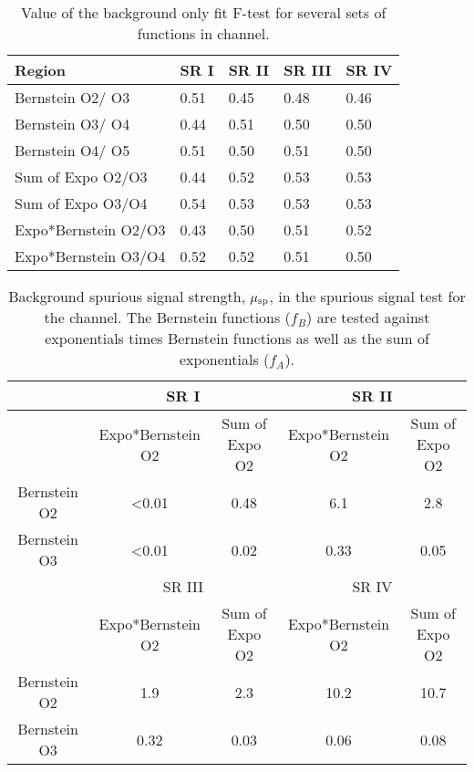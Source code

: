 \begin{table}[htbp]
\centering
\caption{Value of the background only fit F-test for several sets of functions in \twocentral channel.}
\label{tab:f-test_sensitive}
\begin{tabular}{|l|l|l|l|l|}
\hline
Region               & SR I & SR II & SR III & SR IV \\ \hline
Bernstein O2/ O3     & 0.51 & 0.45  & 0.48   & 0.46  \\ \hline
Bernstein O3/ O4     & 0.44 & 0.51  & 0.50   & 0.50  \\ \hline
Bernstein O4/ O5     & 0.51 & 0.50  & 0.51   & 0.50  \\ \hline
Sum of Expo O2/O3    & 0.44 & 0.52  & 0.53   & 0.53  \\ \hline
Sum of Expo O3/O4    & 0.54 & 0.53  & 0.53   & 0.53  \\ \hline
Expo*Bernstein O2/O3 & 0.43 & 0.50  & 0.51   & 0.52  \\ \hline
Expo*Bernstein O3/O4 & 0.52 & 0.52  & 0.51   & 0.50  \\ \hline
\end{tabular}
\end{table}

\begin{table}[htbp]
\centering
\caption{Background spurious signal strength, $\mu_{\rm sp}$, in the spurious signal test for the \twocentral channel. The Bernstein functions ($f_B$) are tested against exponentials times Bernstein functions as well as the sum of exponentials ($f_A$).}
\label{tab:spurious-test-2cen_sensitive}
\begin{tabular}{|c|c|c|c|c|}
\hline
             & \multicolumn{2}{c|}{SR I}                  & \multicolumn{2}{c|}{SR II}                 \\ \hline
             & Expo*Bernstein O2 & Sum of Expo O2 & Expo*Bernstein O2 & Sum of Expo O2 \\ \hline
Bernstein O2 & \textless0.01     & 0.48                   & 6.1               & 2.8                    \\ \hline
Bernstein O3 & \textless0.01     & 0.02                   & 0.33              & 0.05                   \\ \hline
             & \multicolumn{2}{c|}{SR III}                & \multicolumn{2}{c|}{SR IV}                 \\ \hline
             & Expo*Bernstein O2 & Sum of Expo O2 & Expo*Bernstein O2 & Sum of Expo O2 \\ \hline
Bernstein O2 & 1.9               & 2.3                    & 10.2              & 10.7                   \\ \hline
Bernstein O3 & 0.32              & 0.03                   & 0.06              & 0.08                   \\ \hline
\end{tabular}
\end{table}


